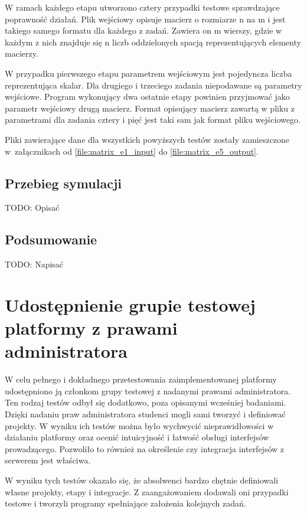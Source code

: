 W ramach każdego etapu utworzono cztery przypadki testowe sprawdzające poprawność działań.
Plik wejściowy opisuje macierz o rozmiarze n na m i jest takiego samego formatu dla każdego z zadań.
Zawiera on m wierszy, gdzie w każdym z nich znajduje się n liczb oddzielonych spacją reprezentujących elementy macierzy.

W przypadku pierwszego etapu parametrem wejściowym jest pojedyncza liczba reprezentująca skalar.
Dla drugiego i trzeciego zadania niepodawane są parametry wejściowe.
Program wykonujący dwa ostatnie etapy powinien przyjmować jako parametr wejściowy drugą macierz.
Format opisujący macierz zawartą w pliku z parametrami dla zadania cztery i pięć jest taki sam jak format pliku wejściowego.

Pliki zawierające dane dla wszystkich powyższych testów zostały zamieszczone w~załącznikach od \ref{file:matrix_e1_input} do \ref{file:matrix_e5_output}.


\subsection{Przebieg symulacji}
\label{matrix_simulation}

TODO: Opisać


\subsection{Podsumowanie}

TODO: Napisać


\section{Udostępnienie grupie testowej platformy z prawami administratora}

W celu pełnego i dokładnego przetestowania zaimplementowanej platformy udostępniono ją członkom grupy testowej z nadanymi prawami administratora.
Ten rodzaj testów odbył się dodatkowo, poza opisanymi wcześniej badaniami.
Dzięki nadaniu praw administratora studenci mogli sami tworzyć i definiować projekty.
W wyniku ich testów można było wychwycić nieprawidłowości w działaniu platformy oraz ocenić intuicyjność i łatwość obsługi interfejsów prowadzącego.
Pozwoliło to również na określenie czy integracja interfejsów z serwerem jest właściwa.

W wyniku tych testów okazało się, że absolwenci bardzo chętnie definiowali własne projekty, etapy i integracje.
Z zaangażowaniem dodawali oni przypadki testowe i tworzyli programy spełniające założenia kolejnych zadań.


